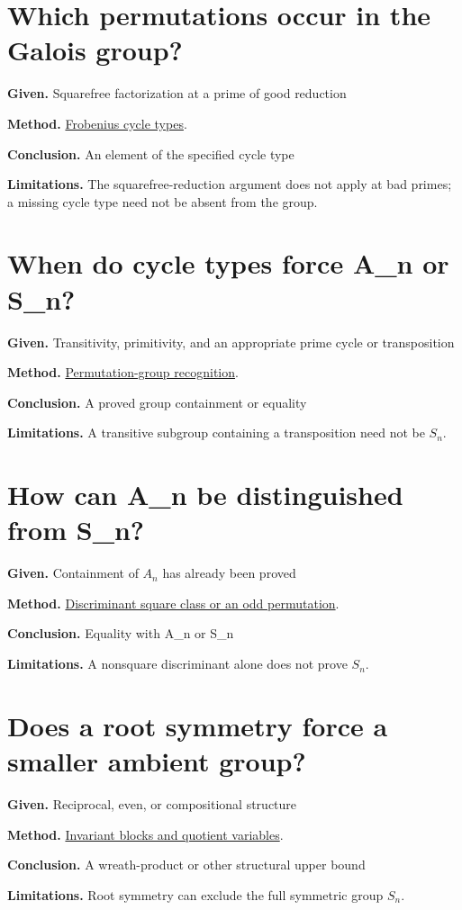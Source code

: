 \documentclass[11pt,a4paper,oneside,openany]{book}
\begin{document}
\section*{Which permutations occur in the Galois group?}
\textbf{Given.} Squarefree factorization at a prime of good reduction\par
\textbf{Method.} \hyperlink{article:frobenius}{Frobenius cycle types}.\par
\textbf{Conclusion.} An element of the specified cycle type\par
\textbf{Limitations.} The squarefree-reduction argument does not apply at bad primes; a missing cycle type need not be absent from the group.\par\medskip
\section*{When do cycle types force A\_\allowbreak{}n or S\_\allowbreak{}n?}
\textbf{Given.} Transitivity, primitivity, and an appropriate prime cycle or transposition\par
\textbf{Method.} \hyperlink{article:permutation-groups}{Permutation-group recognition}.\par
\textbf{Conclusion.} A proved group containment or equality\par
\textbf{Limitations.} A transitive subgroup containing a transposition need not be \(S_n\).\par\medskip
\section*{How can A\_\allowbreak{}n be distinguished from S\_\allowbreak{}n?}
\textbf{Given.} Containment of \(A_n\) has already been proved\par
\textbf{Method.} \hyperlink{article:discriminants}{Discriminant square class or an odd permutation}.\par
\textbf{Conclusion.} Equality with A\_\allowbreak{}n or S\_\allowbreak{}n\par
\textbf{Limitations.} A nonsquare discriminant alone does not prove \(S_n\).\par\medskip
\section*{Does a root symmetry force a smaller ambient group?}
\textbf{Given.} Reciprocal, even, or compositional structure\par
\textbf{Method.} \hyperlink{article:reciprocity}{Invariant blocks and quotient variables}.\par
\textbf{Conclusion.} A wreath-product or other structural upper bound\par
\textbf{Limitations.} Root symmetry can exclude the full symmetric group \(S_n\).\par\medskip
\end{document}
